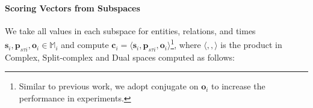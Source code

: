 \documentclass[letterpaper]{article} %
\begin{document}
\paragraph{\textbf{Scoring Vectors from Subspaces}}
We take all values in each subspace for entities, relations, and times
$\boldsymbol{s}_i, \boldsymbol{p}_{s\tau i}, \boldsymbol{o}_i \in \mathbb{M}_i$ and compute $ \boldsymbol{c}_i =  \langle \boldsymbol{s}_i, \boldsymbol{p}_{s\tau i}, {\boldsymbol{o}_i} \rangle$\footnote{Similar to previous work\cite{xu2020tero,lacroix2019tensor}, we adopt conjugate on $\boldsymbol{o}_i$ to increase the performance in experiments.}, where
$\langle , , \rangle$ is the product in Complex, Split-complex and Dual spaces computed as follows:
\end{document}
